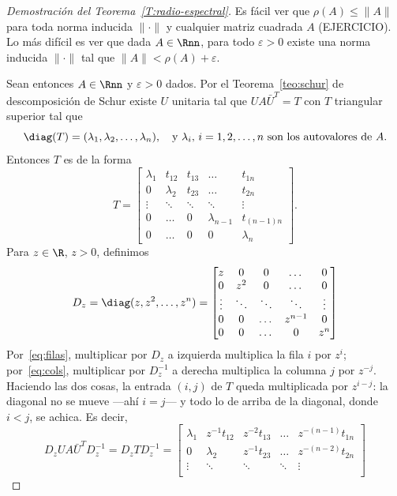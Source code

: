 \begin{proof}[Demostración del Teorema~\ref{T:radio-espectral}]
  Es fácil ver que $\rho(A) \le \|A\|$ para toda norma inducida $\| \cdot \|$ y cualquier matriz cuadrada $A$ (EJERCICIO). Lo más difícil es ver que dada $A\in\Rnn$, para todo $\varepsilon > 0$ existe una norma inducida $\| \cdot \|$ tal que $\|A\| < \rho(A) + \varepsilon$.

  Sean entonces $A\in\Rnn$ y $\varepsilon > 0$ dados.
  Por el Teorema~\ref{teo:schur} de descomposición de Schur existe $U$ unitaria tal que $UA\bar U^T = T$ con $T$ triangular superior tal que
  \[
  \diag(T) = (\lambda_1, \lambda_2,\dots,\lambda_n),\quad\text{y $\lambda_i$, $i=1,2,\dots,n$ son los autovalores de $A$}.
  \]
  Entonces $T$ es de la forma
  \[
  T = \begin{bmatrix}
    \lambda_1 & t_{12}  & t_{13} & \dots & t_{1n} \\
    0      & \lambda_2 & t_{23} & \dots & t_{2n} \\
    \vdots  & \ddots    & \ddots & \ddots & \vdots  \\
    0       & \dots  & 0      & \lambda_{n-1} & t_{(n-1)n}\\
    0       & \dots  & 0      & 0     & \lambda_n
  \end{bmatrix}.
  \]
  Para $z \in \R$, $z > 0$, definimos
  \[
  D_z = \diag(z,z^2,\dots,z^n) =
  \begin{bmatrix}z & 0   & 0   & \dots & 0 \\
    0 & z^2 & 0   & \dots & 0 \\
    \vdots & \ddots & \ddots & \ddots & \vdots \\
    0 & 0 & \dots & z^{n-1} & 0 \\
    0 & 0 & \dots & 0 & z^n
  \end{bmatrix}
  \]
  Por~\eqref{eq:filas}, multiplicar por $D_z$ a izquierda multiplica la fila
  $i$ por $z^i$; por~\eqref{eq:cols}, multiplicar por $D_z^{-1}$ a derecha
  multiplica la columna $j$ por $z^{-j}$. Haciendo las dos cosas, la entrada
  $(i,j)$ de $T$ queda multiplicada por $z^{i-j}$: la diagonal no se mueve
  ---ahí $i=j$--- y todo lo de arriba de la diagonal, donde $i<j$, se achica.
  Es decir,
  \[
  D_z  U A \bar U^T D_z^{-1} =
  D_z T D_z^{-1} = \begin{bmatrix}
    \lambda_1 & z^{-1} t_{12} & z^{-2} t_{13}  & \dots & z^{-(n-1)} t_{1n} \\
    0      & \lambda_2 & z^{-1}t_{23}  & \dots & z^{-(n-2)}t_{2n} \\
    \vdots  & \ddots    & \ddots & \ddots & \vdots  \\

\end{bmatrix}\]
\end{proof}

